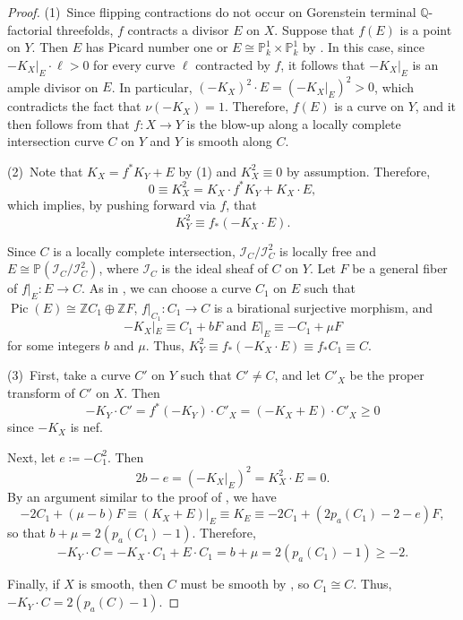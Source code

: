\documentclass[12pt]{amsart}
\def\ge{\geqslant}
\def\Pic{\operatorname{Pic}}
\newcommand{\Q}{\mathbb{Q}}
\theoremstyle{plain}
\theoremstyle{definition}
\theoremstyle{remark}
\newtheorem{defn and notation}[thm]{Definition and Notation}
\theoremstyle{plain}
\begin{document}
\begin{proof}
(1)\,
    Since flipping contractions do not occur on Gorenstein terminal $\Q$-factorial threefolds, $f$ contracts a divisor $E$ on $X$. 
Suppose that $f(E)$ is a point on $Y$. 
Then $E$ has Picard number one or $E\cong \mathbb{P}^1_k\times \mathbb{P}^1_k$ by \cite[Theorem 5]{Cutkosky88}. 
In this case, since $-K_X|_E\cdot \ell>0$ for every curve $\ell$ contracted by $f$, it follows that $-K_X|_E$ is an ample divisor on $E$. 
In particular, $(-K_X)^2\cdot E=(-K_X|_E)^2>0$, which contradicts the fact that $\nu(-K_X)=1$. 
Therefore, $f(E)$ is a curve on $Y$, and it then follows from \cite[Theorem 4]{Cutkosky88} that $f\colon X\to Y$ is the blow-up along a locally complete intersection curve $C$ on $Y$ and $Y$ is smooth along $C$.


(2)\, Note that $K_X=f^*K_Y+E$ by (1) and $K_X^2 \equiv 0$ by assumption. Therefore, 
\[
0 \equiv K_X^2=K_X \cdot f^*K_Y+ K_X \cdot E, 
\]
which implies, by pushing forward via $f$, that 
\[
K_Y^2 \equiv f_*(-K_X \cdot E). 
\]

Since $C$ is a locally complete intersection, 
$\mathcal{I}_C/\mathcal{I}^2_C$ is locally free and $E\cong \mathbb{P}(\mathcal{I}_C/\mathcal{I}^2_C)$, where $\mathcal{I}_C$ is the ideal sheaf of $C$ on $Y$. 
Let $F$ be a general fiber of $f|_E:E\to C$.
As in \cite[Lemma 2.1]{Xie05}, we can choose a curve $C_1$ on $E$ such that $\Pic(E)\cong \mathbb{Z}C_1\oplus \mathbb{Z}F$, $f|_{C_1}\colon C_1\to C$ is a birational surjective morphism, and 
\[
-K_X|_E\equiv C_1+bF\,\,\text{and}\,\,E|_E\equiv -C_1+\mu F
\]
for some integers $b$ and $\mu$. 
Thus, $K_Y^2 \equiv f_*(-K_X \cdot E) \equiv f_*C_1 \equiv C$. 

(3)\,
First, take a curve $C'$ on $Y$ such that $C'\neq C$, and let $C'_X$ be the proper transform of $C'$ on $X$.
Then 
\[-K_Y\cdot C'=f^{*}(-K_Y)\cdot C'_X =(-K_X+E)\cdot C'_X\geq 0
\]
since $-K_X$ is nef.

Next, let $e\coloneqq -C_1^2$. Then 
\[2b-e=(-K_X|_E)^2=K_X^2 \cdot E=0.\]
By an argument similar to the proof of \cite[Lemma 2.1]{Xie05}, we have 
\[
-2C_1+(\mu-b)F \equiv (K_X+E)|_E \equiv K_E \equiv -2C_1+(2 p_a(C_1)-2-e)F, 
\]
so that $b+\mu=2(p_a(C_1)-1)$. 
Therefore,
\[
-K_Y\cdot C=-K_X \cdot C_1+E \cdot C_1=b+\mu=2(p_a(C_1)-1)\ge -2.
\]

Finally, if $X$ is smooth, then $C$ must be smooth by \cite[Theorem 3.3]{Mori}, so $C_1\cong C$. 
Thus, $-K_Y\cdot C=2(p_a(C)-1)$.


\end{proof}
\end{document}
